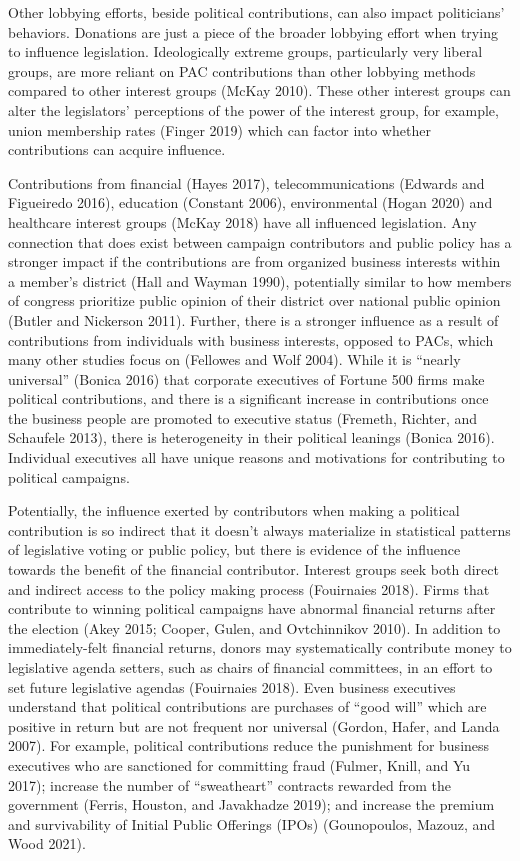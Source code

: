 \documentclass[12pt,]{article}
\begin{document}
Other lobbying efforts, beside political contributions, can also impact
politicians' behaviors. Donations are just a piece of the broader
lobbying effort when trying to influence legislation. Ideologically
extreme groups, particularly very liberal groups, are more reliant on
PAC contributions than other lobbying methods compared to other interest
groups (McKay 2010). These other interest groups can alter the
legislators' perceptions of the power of the interest group, for
example, union membership rates (Finger 2019) which can factor into
whether contributions can acquire influence.

Contributions from financial (Hayes 2017), telecommunications (Edwards
and Figueiredo 2016), education (Constant 2006), environmental (Hogan
2020) and healthcare interest groups (McKay 2018) have all influenced
legislation. Any connection that does exist between campaign
contributors and public policy has a stronger impact if the
contributions are from organized business interests within a member's
district (Hall and Wayman 1990), potentially similar to how members of
congress prioritize public opinion of their district over national
public opinion (Butler and Nickerson 2011). Further, there is a stronger
influence as a result of contributions from individuals with business
interests, opposed to PACs, which many other studies focus on (Fellowes
and Wolf 2004). While it is ``nearly universal'' (Bonica 2016) that
corporate executives of Fortune 500 firms make political contributions,
and there is a significant increase in contributions once the business
people are promoted to executive status (Fremeth, Richter, and Schaufele
2013), there is heterogeneity in their political leanings (Bonica 2016).
Individual executives all have unique reasons and motivations for
contributing to political campaigns.

Potentially, the influence exerted by contributors when making a
political contribution is so indirect that it doesn't always materialize
in statistical patterns of legislative voting or public policy, but
there is evidence of the influence towards the benefit of the financial
contributor. Interest groups seek both direct and indirect access to the
policy making process (Fouirnaies 2018). Firms that contribute to
winning political campaigns have abnormal financial returns after the
election (Akey 2015; Cooper, Gulen, and Ovtchinnikov 2010). In addition
to immediately-felt financial returns, donors may systematically
contribute money to legislative agenda setters, such as chairs of
financial committees, in an effort to set future legislative agendas
(Fouirnaies 2018). Even business executives understand that political
contributions are purchases of ``good will'' which are positive in
return but are not frequent nor universal (Gordon, Hafer, and Landa
2007). For example, political contributions reduce the punishment for
business executives who are sanctioned for committing fraud (Fulmer,
Knill, and Yu 2017); increase the number of ``sweatheart'' contracts
rewarded from the government (Ferris, Houston, and Javakhadze 2019); and
increase the premium and survivability of Initial Public Offerings
(IPOs) (Gounopoulos, Mazouz, and Wood 2021).
\end{document}
